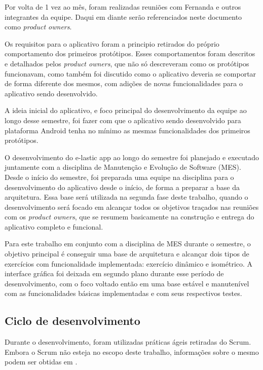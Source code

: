 Por volta de 1 vez ao mês, foram realizadas reuniões com Fernanda e outros integrantes da equipe. Daqui em diante serão referenciados neste documento como \textit{product owners}.

Os requisitos para o aplicativo foram a principio retirados do próprio comportamento dos primeiros protótipos. Esses comportamentos foram descritos e detalhados pelos \textit{product owners}, que não só descreveram como os protótipos funcionavam, como também foi discutido como o aplicativo deveria se comportar de forma diferente dos mesmos, com adições de novas funcionalidades para o aplicativo sendo desenvolvido.

A ideia inicial do aplicativo, e foco principal do desenvolvimento da equipe ao longo desse semestre, foi fazer com que o aplicativo sendo desenvolvido para plataforma Android tenha no mínimo as mesmas funcionalidades dos primeiros protótipos. 

O desenvolvimento do e-lastic app ao longo do semestre foi planejado e executado juntamente com a disciplina de Manutenção e Evolução de Software (MES). Desde o início do semestre, foi preparada uma equipe na disciplina para o desenvolvimento do aplicativo desde o início, de forma a preparar a base da arquitetura. Essa base será utilizada na segunda fase deste trabalho, quando o desenvolvimento será focado em alcançar todos os objetivos traçados nas reuniões com os \textit{product owners}, que se resumem basicamente na construção e entrega do aplicativo completo e funcional.

Para este trabalho em conjunto com a disciplina de MES durante o semestre, o objetivo principal é conseguir uma base de arquitetura e alcançar dois tipos de exercícios com funcionalidade implementada: exercício dinâmico e isométrico. A interface gráfica foi deixada em segundo plano durante esse período de desenvolvimento, com o foco voltado então em uma base estável e manutenível com as funcionalidades básicas implementadas e com seus respectivos testes.

\subsection{Ciclo de desenvolvimento}		

Durante o desenvolvimento, foram utilizadas práticas ágeis retiradas do Scrum. Embora o Scrum não esteja no escopo deste trabalho, informações sobre o mesmo podem ser obtidas em .

